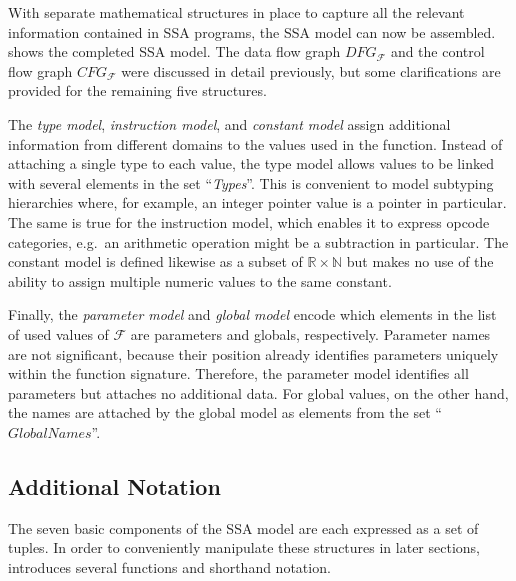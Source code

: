 \begin{figure}[p]
    
\end{figure}

    With separate mathematical structures in place to capture all the relevant
    information contained in SSA programs, the SSA model can now be assembled.
     shows the completed SSA model.
    The data flow graph $DFG_\mathcal F$ and the control flow graph
    $CFG_\mathcal F$ were discussed in detail previously, but some
    clarifications are provided for the remaining five structures.

    The {\it type model}, {\it instruction model}, and {\it constant model}
    assign additional information from different domains to the values used in
    the function.
    Instead of attaching a single type to each value, the type model
    allows values to be linked with several elements in the set ``{\it Types}''.
    This is convenient to model subtyping hierarchies where, for example, an
    integer pointer value is a pointer in particular.
    The same is true for the instruction model, which enables it to express
    opcode categories, e.g.\ an arithmetic operation might be a subtraction in
    particular.
    The constant model is defined likewise as a subset of
    $\mathbb R\times\mathbb N$ but makes no use of the ability to assign
    multiple numeric values to the same constant.
    
    Finally, the {\it parameter model} and {\it global model} encode which
    elements in the list of used values of $\mathcal F$ are parameters and
    globals, respectively.
    Parameter names are not significant, because their position already
    identifies parameters uniquely within the function signature.
    Therefore, the parameter model identifies all parameters but attaches
    no additional data.
    For global values, on the other hand, the names are attached by the
    global model as elements from the set ``$\textit{GlobalNames}$''.

\subsection{Additional Notation}

    The seven basic components of the SSA model are each expressed as a set of
    tuples.
    In order to conveniently manipulate these structures in later sections, 
     introduces several functions and shorthand notation.

